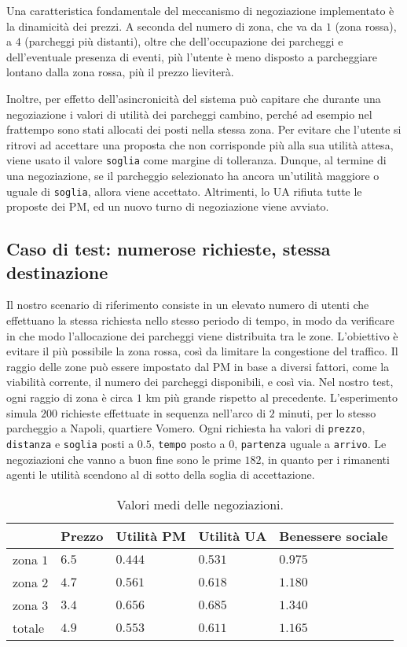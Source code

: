 \documentclass[11pt,a4paper,twoside]{article}
\numberwithin{figure}{section}
\numberwithin{equation}{section}
\begin{document}
Una caratteristica fondamentale del meccanismo di negoziazione implementato è la dinamicità dei prezzi. A seconda del numero di zona, che va da $1$ (zona rossa), a $4$ (parcheggi più distanti), oltre che dell'occupazione dei parcheggi e dell'eventuale presenza di eventi, più l'utente è meno disposto a parcheggiare lontano dalla zona rossa, più il prezzo lieviterà.

Inoltre, per effetto dell'asincronicità del sistema può capitare che durante una negoziazione i valori di utilità dei parcheggi cambino, perché ad esempio nel frattempo sono stati allocati dei posti nella stessa zona. Per evitare che l'utente si ritrovi ad accettare una proposta che non corrisponde più alla sua utilità attesa, viene usato il valore \texttt{soglia} come margine di tolleranza. Dunque, al termine di una negoziazione, se il parcheggio selezionato ha ancora un'utilità maggiore o uguale di \texttt{soglia}, allora viene accettato. Altrimenti, lo UA rifiuta tutte le proposte dei PM, ed un nuovo turno di negoziazione viene avviato.

\subsection{Caso di test: numerose richieste, stessa destinazione}

Il nostro scenario di riferimento consiste in un elevato numero di utenti che effettuano la stessa richiesta nello stesso periodo di tempo, in modo da verificare in che modo l'allocazione dei parcheggi viene distribuita tra le zone. L'obiettivo è evitare il più possibile la zona rossa, così da limitare la congestione del traffico. Il raggio delle zone può essere impostato dal PM in base a diversi fattori, come la viabilità corrente, il numero dei parcheggi disponibili, e così via. 
Nel nostro test, ogni raggio di zona è circa $1$ km più grande rispetto al precedente.
L'esperimento simula $200$ richieste effettuate in sequenza nell'arco di $2$ minuti, per lo stesso parcheggio a Napoli, quartiere Vomero. Ogni richiesta ha valori di \texttt{prezzo}, \texttt{distanza} e \texttt{soglia} posti a $0.5$, \texttt{tempo} posto a $0$, \texttt{partenza} uguale a \texttt{arrivo}.
Le negoziazioni che vanno a buon fine sono le prime $182$, in quanto per i rimanenti agenti le utilità scendono al di sotto della soglia di accettazione.

\begin{table}[ht]
    \centering
    \begin{tabular}{lllll}
    \arrayrulecolor{gray}
    \toprule
    & Prezzo & Utilità PM & Utilità UA & Benessere sociale \\
    \midrule
    zona $1$ & $6.5$ & $0.444$ & $0.531$ & $0.975$ \\
    zona $2$ & $4.7$ & $0.561$ & $0.618$ & $1.180$ \\
    zona $3$ & $3.4$ & $0.656$ & $0.685$ & $1.340$ \\
    \midrule
    totale & $4.9$ & $0.553$ & $0.611$ & $1.165$ \\
    \bottomrule
    \end{tabular}
    \label{tab:1}
    \caption{Valori medi delle negoziazioni.}
\end{table}
\end{document}
